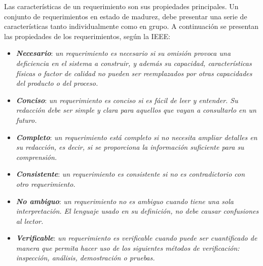 \documentclass[11pt,oneside]{book}
\begin{document}
\newpage
Las características de un requerimiento son sus propiedades principales. Un conjunto de requerimientos en estado de madurez, debe presentar una serie de características tanto individualmente como en grupo. A continuación se presentan las propiedades de los requerimientos, según la IEEE:
\begin{itemize}
\item \textit{\textbf{Necesario}}: \textit{un requerimiento es necesario si su omisión provoca una deficiencia en el sistema a construir, y además su capacidad, características físicas o factor de calidad no pueden ser reemplazados por otras capacidades del producto o del proceso.}

\item \textit{\textbf{Conciso}}: \textit{un requerimiento es conciso si es fácil de leer y entender. Su redacción debe ser simple y clara para aquellos que vayan a consultarlo en un futuro.}

\item \textit{\textbf{Completo}}: \textit{un requerimiento está completo si no necesita ampliar detalles en su redacción, es decir, si se proporciona la información suficiente para su comprensión.}

\item \textit{\textbf{Consistente}}: \textit{un requerimiento es consistente si no es contradictorio con otro requerimiento.}

\item \textit{\textbf{No ambiguo}}: \textit{un requerimiento no es ambiguo cuando tiene una sola interpretación. El lenguaje usado en su definición, no debe causar confusiones al lector.}

\item \textit{\textbf{Verificable}}: \textit{un requerimiento es verificable cuando puede ser cuantificado de manera que permita hacer uso de los siguientes métodos de verificación: inspección, análisis, demostración o pruebas.}
\end{itemize}
\end{document}
